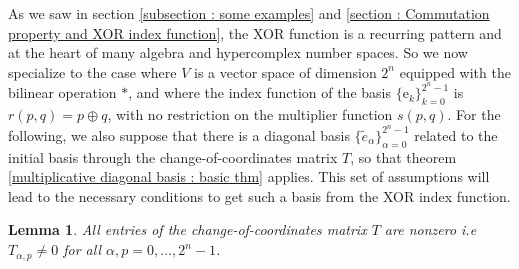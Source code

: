 \documentclass{article}
\newtheorem{lemma}[theorem]{Lemma}
\begin{document}
As we saw in section \ref{subsection : some examples} and \ref{section : Commutation property and XOR index function}, the XOR function is a recurring pattern and at the heart of many algebra and hypercomplex number spaces. So we now specialize to the case where $V$ is a vector space of dimension $2^n$ equipped with the bilinear operation $*$, and where the index function of the basis $\{ \mathrm e_k \}_{k=0}^{2^n-1}$ is $r(p,q) = p \oplus q$, with no restriction on the multiplier function $s(p,q)$. For the following, we also suppose that there is a diagonal basis $\{ {\tilde e}_{\alpha} \}_{\alpha=0}^{2^n-1}$ related to the initial basis through the change-of-coordinates matrix $T$, so that theorem \ref{multiplicative diagonal basis : basic thm} applies. This set of assumptions will lead to the necessary conditions to get such a basis from the XOR index function.
\begin{lemma}
    \label{diagonal basis XOR : T nonzero}
    All entries of the change-of-coordinates matrix $T$ are nonzero i.e $T_{\alpha,p} \neq 0$ for all $\alpha,p = 0,\ldots, 2^n-1$.
\end{lemma}
\end{document}
